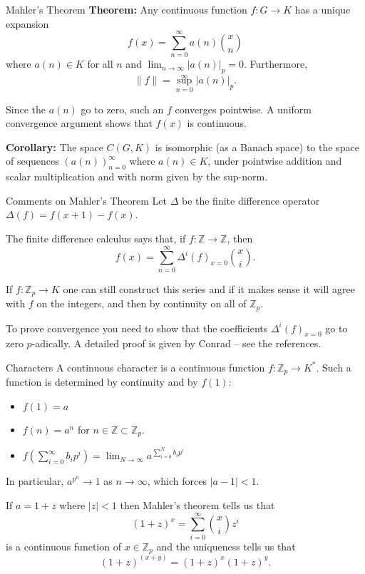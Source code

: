 \documentclass[
  ignorenonframetext,
]{beamer}
\providecommand{\tightlist}{%
  \setlength{\itemsep}{0pt}\setlength{\parskip}{0pt}}
\begin{document}
\begin{frame}{Mahler's Theorem}
\protect\hypertarget{mahlers-theorem}{}
\textbf{Theorem:} Any continuous function \(f:G\to K\) has a unique
expansion \[
f(x)=\sum_{n=0}^{\infty} a(n)\binom{x}{n}
\] where \(a(n)\in K\) for all \(n\) and
\(\lim_{n\to\infty} |a(n)|_p=0\). Furthermore, \[
\|f\|=\sup_{n=0}^{\infty} |a(n)|_p.
\]

Since the \(a(n)\) go to zero, such an \(f\) converges pointwise. A
uniform convergence argument shows that \(f(x)\) is continuous.

\textbf{Corollary:} The space \(C(G,K)\) is isomorphic (as a Banach
space) to the space of sequences \((a(n))_{n=0}^{\infty}\) where
\(a(n)\in K\), under pointwise addition and scalar multiplication and
with norm given by the sup-norm.
\end{frame}

\begin{frame}{Comments on Mahler's Theorem}
\protect\hypertarget{comments-on-mahlers-theorem}{}
Let \(\Delta\) be the finite difference operator
\(\Delta(f)=f(x+1)-f(x)\).

The finite difference calculus says that, if
\(f:\mathbb{Z}\to\mathbb{Z}\), then \[
f(x) = \sum_{n=0}^{\infty} \Delta^{i}(f)_{x=0}\binom{x}{i}.
\]

If \(f:\mathbb{Z}_p\to K\) one can still construct this series and if it
makes sense it will agree with \(f\) on the integers, and then by
continuity on all of \(\mathbb{Z}_p\).

To prove convergence you need to show that the coefficients
\(\Delta^{i}(f)_{x=0}\) go to zero \(p\)-adically. A detailed proof is
given by Conrad -- see the references.
\end{frame}

\begin{frame}{Characters}
\protect\hypertarget{characters}{}
A continuous character is a continuous function
\(f:\mathbb{Z}_p\to K^{*}\). Such a function is determined by continuity
and by \(f(1)\):

\begin{itemize}
\tightlist
\item
  \(f(1)=a\)
\item
  \(f(n)=a^n\) for \(n\in\mathbb{Z}\subset\mathbb{Z}_p\).
\item
  \(f(\sum_{i=0}^{\infty} b_i p^i)=\lim_{N\to\infty} a^{\sum_{i=0}^{N} b_i p^i}\)
\end{itemize}

In particular, \(a^{p^{n}}\to 1\) as \(n\to\infty\), which forces
\(|a-1|<1\).

If \(a=1+z\) where \(|z|<1\) then Mahler's theorem tells us that \[
(1+z)^x=\sum_{i=0}^{\infty} \binom{x}{i}z^{i}
\] is a continuous function of \(x\in\mathbb{Z}_p\) and the uniqueness
tells us that \[
(1+z)^{(x+y)}=(1+z)^x(1+z)^y.
\]
\end{frame}
\end{document}

